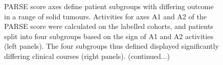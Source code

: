 \documentclass[dissertation.tex]{subfiles}
\begin{document}
\begin{figure}[!h]
  \caption[Survival subgroups defined by \acrshort{PARSE} score axes in different tumours]{\acrshort{PARSE} score axes define patient subgroups with differing outcome in a range of solid tumours.  Activities for axes A1 and A2 of the \acrshort{PARSE} score were calculated on the labelled cohorts, and patients split into four subgroups based on the sign of A1 and A2 activities (left panels).  The four subgroups thus defined displayed significantly differing clinical courses (right panels).  (continued...)}\label{fig:sigs-km}
\end{figure}
\end{document}
